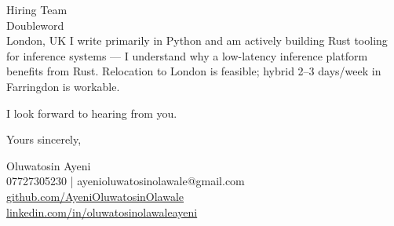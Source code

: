 \documentclass[11pt,a4paper]{letter}
\begin{document}
\begin{letter}{Hiring Team \\ Doubleword \\ London, UK}
I write primarily in Python and am actively building Rust tooling for inference systems — I understand why a low-latency inference platform benefits from Rust. Relocation to London is feasible; hybrid 2--3 days/week in Farringdon is workable.

I look forward to hearing from you.

\closing{Yours sincerely,}

\vspace{0.5cm}
Oluwatosin Ayeni \\
07727305230 | ayenioluwatosinolawale@gmail.com \\
\href{https://github.com/AyeniOluwatosinOlawale}{github.com/AyeniOluwatosinOlawale} \\
\href{https://www.linkedin.com/in/oluwatosinolawaleayeni/}{linkedin.com/in/oluwatosinolawaleayeni}

\end{letter}
\end{document}
